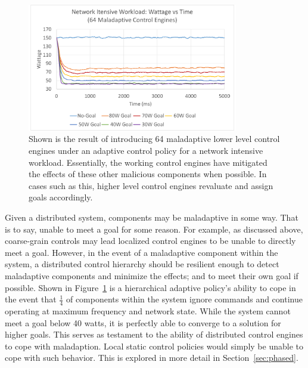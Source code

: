             \begin{figure}[htb!]
                \centering
                \includegraphics[width=0.82\textwidth]{Fig/network_maladaptive.pdf}
                \caption[Network Intensive Workload Using an Adaptive Goal Adjustment Policy with Maladaptive System Components (Watts vs Time)]{Shown is the result of introducing 64 maladaptive lower level control engines under an adaptive control policy for a network intensive workload. Essentially, the working control engines have mitigated the effects of these other malicious components when possible. In cases such as this, higher level control engines revaluate and assign goals accordingly.}
                \label{fig:network_maladaptive}
            \end{figure}

            Given a distributed system, components may be maladaptive in some way. That is to say, unable to meet a goal for some reason. For example, as discussed above, coarse-grain controls may lead localized control engines to be unable to directly meet a goal. However, in the event of a maladaptive component within the system, a distributed control hierarchy should be resilient enough to detect maladaptive components and minimize the effects; and to meet their own goal if possible. Shown in Figure~\ref{fig:network_maladaptive} is a hierarchical adaptive policy's ability to cope in the event that $\frac{1}{4}$ of components within the system ignore commands and continue operating at maximum frequency and network state. While the system cannot meet a goal below 40 watts, it is perfectly able to converge to a solution for higher goals. This serves as testament to the ability of distributed control engines to cope with maladaption. Local static control policies would simply be unable to cope with such behavior. This is explored in more detail in Section~\ref{sec:phased}.

